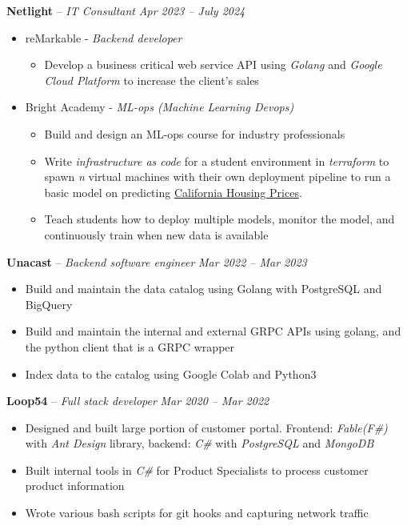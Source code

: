 \documentclass[10pt,letterpaper]{article}
\begin{document}
\headedsection
{\textbf{Netlight} -- \textit{IT Consultant}}
{\textit{Apr 2023 -- July 2024}} {
	\begin{itemize}[noitemsep,nolistsep]
		\item reMarkable - {\it Backend developer}
			\begin{itemize}[noitemsep,nolistsep]
				\item Develop a business critical web service API using {\it
					Golang} and {\it Google Cloud Platform} to increase the client's sales
			\end{itemize}
		\item Bright Academy - {\it ML-ops (Machine Learning Devops)}
			\begin{itemize}[noitemsep,nolistsep]
				\item Build and design an ML-ops course for industry professionals
				\item Write {\it infrastructure as code} for a student environment in {\it terraform} to spawn {\it n} virtual machines with their own deployment pipeline to run a basic model on predicting \href{https://www.kaggle.com/datasets/camnugent/california-housing-prices}{California Housing Prices}.
				\item Teach students how to deploy multiple models, monitor the model, and continuously train when new data is available
			\end{itemize}
	\end{itemize}
}

\headedsection
{\textbf{Unacast} -- \textit{Backend software engineer}}
{\textit{Mar 2022 -- Mar 2023}} {
	\begin{itemize}[noitemsep,nolistsep]
		\item Build and maintain the data catalog using Golang with PostgreSQL and BigQuery
		\item Build and maintain the internal and external GRPC APIs using golang, and the python client that is a GRPC wrapper
		\item Index data to the catalog using Google Colab and Python3
	\end{itemize}
	}

\headedsection
{\textbf{Loop54} -- \textit{Full stack developer}}
{\textit{Mar 2020 -- Mar 2022}} {
	\begin{itemize}[noitemsep,nolistsep]
		\item Designed and built large portion of customer portal. Frontend: \textit{Fable(F\#)} with \textit{Ant Design} library, backend: \textit{C\#} with \textit{PostgreSQL} and \textit{MongoDB}
		\item Built internal tools in \textit{C\#} for Product Specialists to process customer product information
		\item Wrote various bash scripts for git hooks and capturing network traffic
	\end{itemize}
}
\end{document}
